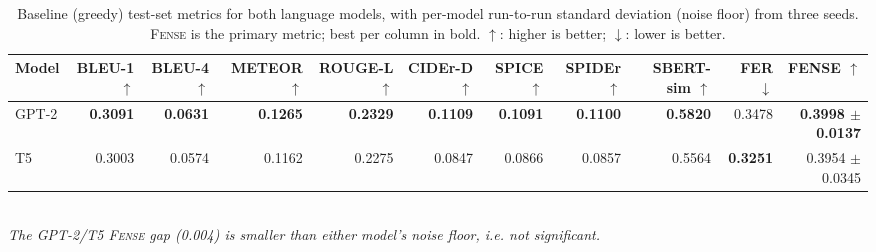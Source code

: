 \begin{table}[t]
\centering
\caption{Baseline (greedy) test-set metrics for both language models, with per-model run-to-run standard deviation (noise floor) from three seeds. \textsc{Fense} is the primary metric; best per column in bold. $\uparrow$: higher is better; $\downarrow$: lower is better.}
\label{tab:baseline}
\footnotesize
\setlength{\tabcolsep}{4pt}
\begin{tabular}{lrrrrrrrrrr}
\toprule
Model & BLEU-1 $\uparrow$ & BLEU-4 $\uparrow$ & METEOR $\uparrow$ & ROUGE-L $\uparrow$ & CIDEr-D $\uparrow$ & SPICE $\uparrow$ & SPIDEr $\uparrow$ & SBERT-sim $\uparrow$ & FER $\downarrow$ & FENSE $\uparrow$ \\
\midrule
GPT-2 & \textbf{0.3091} & \textbf{0.0631} & \textbf{0.1265} & \textbf{0.2329} & \textbf{0.1109} & \textbf{0.1091} & \textbf{0.1100} & \textbf{0.5820} & 0.3478 & \textbf{0.3998 {\scriptsize$\pm$0.0137}} \\
T5 & 0.3003 & 0.0574 & 0.1162 & 0.2275 & 0.0847 & 0.0866 & 0.0857 & 0.5564 & \textbf{0.3251} & 0.3954 {\scriptsize$\pm$0.0345} \\
\bottomrule
\end{tabular}
\\[2pt]{\footnotesize\emph{The GPT-2/T5 \textsc{Fense} gap (0.004) is smaller than either model's noise floor, i.e. not significant.}}
\end{table}
